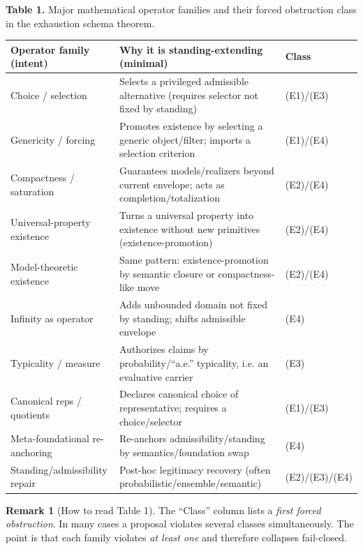 \documentclass[11pt]{article}
\theoremstyle{definition}
\newtheorem{remark}[theorem]{Remark}
\begin{document}
\begin{table}[h]
\centering
\smallskip
\noindent\textbf{Table 1.} Major mathematical operator families and their forced obstruction class in the exhaustion schema theorem.
\medskip

\begin{tabular}{@{}p{}p{}p{}@{}}
\toprule
Operator family (intent) & Why it is standing-extending (minimal) & Class \\
\midrule
Choice / selection & Selects a privileged admissible alternative (requires selector not fixed by standing) & (E1)/(E3) \\
Genericity / forcing & Promotes existence by selecting a generic object/filter; imports a selection criterion & (E1)/(E4) \\
Compactness / saturation & Guarantees models/realizers beyond current envelope; acts as completion/totalization & (E2)/(E4) \\
Universal-property existence & Turns a universal property into existence without new primitives (existence-promotion) & (E2)/(E4) \\
Model-theoretic existence & Same pattern: existence-promotion by semantic closure or compactness-like move & (E2)/(E4) \\
Infinity as operator & Adds unbounded domain not fixed by standing; shifts admissible envelope & (E4) \\
Typicality / measure & Authorizes claims by probability/``a.e.'' typicality, i.e. an evaluative carrier & (E3) \\
Canonical reps / quotients & Declares canonical choice of representative; requires a choice/selector & (E1)/(E3) \\
Meta-foundational re-anchoring & Re-anchors admissibility/standing by semantics/foundation swap & (E4) \\
Standing/admissibility repair & Post-hoc legitimacy recovery (often probabilistic/ensemble/semantic) & (E2)/(E3)/(E4) \\
\bottomrule
\end{tabular}
\end{table}

\begin{remark}[How to read Table 1]
The ``Class'' column lists a \emph{first forced obstruction}. In many cases a proposal violates several classes simultaneously.
The point is that each family violates \emph{at least one} and therefore collapses fail-closed.
\end{remark}
\end{document}
